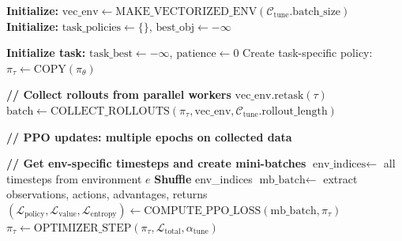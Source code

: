 \documentclass[11pt,a4paper]{article}
\begin{document}
\clearpage


\begin{algorithm}[h]
\caption{PHASE\_FINE\_TUNE: Per-Task PPO with Vectorized Environments}
\label{alg:phase2}
\begin{algorithmic}[1]



\State \textbf{Initialize:} $\text{vec\_env} \leftarrow \text{MAKE\_VECTORIZED\_ENV}(\mathcal{C}_{\text{tune}}.\text{batch\_size})$
\State \textbf{Initialize:} $\text{task\_policies} \leftarrow \{\}$, $\text{best\_obj} \leftarrow -\infty$


	\State \textbf{Initialize task:} $\text{task\_best} \leftarrow -\infty$, $\text{patience} \leftarrow 0$
	\State Create task-specific policy: $\pi_\tau \leftarrow \text{COPY}(\pi_\theta)$


		\State \textbf{// Collect rollouts from parallel workers}
		\State $\text{vec\_env.retask}(\tau)$
		\State $\text{batch} \leftarrow \text{COLLECT\_ROLLOUTS}(\pi_\tau, \text{vec\_env}, \mathcal{C}_{\text{tune}}.\text{rollout\_length})$

		\State \textbf{// PPO updates: multiple epochs on collected data}

				\State \textbf{// Get env-specific timesteps and create mini-batches}
				\State $\text{env\_indices} \leftarrow$ all timesteps from environment $e$
				\State \textbf{Shuffle} env\_indices
					\State $\text{mb\_batch} \leftarrow$ extract observations, actions, advantages, returns
					\State $(\mathcal{L}_\text{policy}, \mathcal{L}_\text{value}, \mathcal{L}_\text{entropy}) \leftarrow \text{COMPUTE\_PPO\_LOSS}(\text{mb\_batch}, \pi_\tau)$
					\State $\pi_\tau \leftarrow \text{OPTIMIZER\_STEP}(\pi_\tau, \mathcal{L}_\text{total}, \alpha_\text{tune})$
				\EndFor
			\EndFor


\end{algorithmic}
\end{algorithm}
\end{document}
